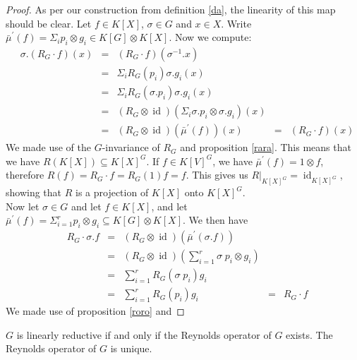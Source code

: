 \begin{proof}
  As per our construction from definition \ref{da}, the linearity of this map should be clear.
  Let $f \in K[X]$, $\sigma \in G$ and $x \in X$.
  Write $\bar{\mu}^\prime (f) = \Sigma_i p_i \otimes g_i \in K[G] \otimes K[X] $.
  Now we compute:
  \begin{equation}
    \begin{aligned}
      &\sigma. \left( R_G \cdot f \right) (x)
      &=& \left( R_G \cdot f \right) (\sigma^{-1}.x)\\
      &&=& \Sigma_i R_G \left( p_i \right)  \sigma.g_i \left(  x \right) \\
      &&=& \Sigma_i R_G (\sigma.p_i)  \sigma.g_i (x)\\
      &&=& \left( R_G \otimes \operatorname{id} \right) \left( \Sigma_i \sigma.p_i \otimes \sigma.g_i \right) (x)\\
      &&=& (R_G \otimes \operatorname{id}) (\bar{\mu}^\prime (f)) (x)
      &=& (R_G \cdot f) (x)
    \end{aligned}
  \end{equation}
  We made use of the $G$-invariance of $R_G$ and proposition \ref{rara}.
  This means that we have $R(K[X]) \subseteq K[X]^G$.
  If $f \in K[V]^G$, we have $\bar{\mu}^\prime (f) = 1 \otimes f$, therefore $R(f) = R_G \cdot f = R_G (1)f = f$.
  This gives us $\left. R \right|_{K[X]^G} = \operatorname{id}_{K[X]^G}$, showing that $R$ is a projection of $K[X]$ onto $K[X]^G$.\\
  Now let $\sigma \in G$ and let $ f \in K[X]$, and let $\bar{\mu}^\prime(f) = \Sigma_{i=1}^r p_i \otimes g_i \subseteq K[G] \otimes K[X]$.
  We then have
  \begin{equation}
    \begin{aligned}
      &R_G \cdot \sigma.f
      &=& (R_G \otimes \operatorname{id}) \left(\bar{\mu}^\prime(\sigma.f)\right)\\
      &&=& (R_G \otimes \operatorname{id}) \left(\sum_{i=1}^r \sigma \dot{\phantom{.}}p_i \otimes g_i \right)\\
      &&=& \sum_{i=1}^r R_G(\sigma\dot{\phantom{.}}p_i)g_i\\
      &&=& \sum_{i=1}^r R_G(p_i)g_i
      &=& R_G \cdot f
    \end{aligned}
  \end{equation}
We made use of proposition \ref{roro} and 
\end{proof}

\begin{corollary}
  $G$ is linearly reductive if and only if the Reynolds operator of $G$ exists.
  The Reynolds operator of $G$ is unique.
\end{corollary}
